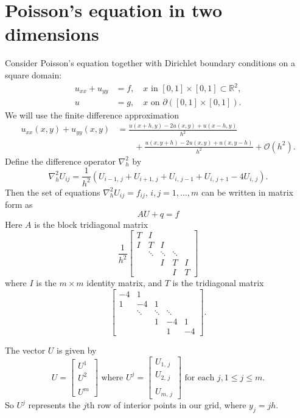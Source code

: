 \section{Poisson's equation in two dimensions}

Consider Poisson's equation together with Dirichlet boundary conditions on a square domain:
\begin{align*}
	u_{xx} + u_{yy} &= f,\quad x \text{ in } [0,1]\times[0,1] \subset \mathbb{R}^2,\\
	u &= g, \quad x \text{ on } \partial \left( [0,1]\times[0,1]\right).
\end{align*}
We will use the finite difference approximation
\begin{align*}
u_{xx}(x,y) + u_{yy}(x,y) &= \frac{u(x+h,y) - 2u(x,y)+ u(x-h,y)}{h^2} \\
& \qquad{}+ 
\frac{u(x,y+h) - 2u(x,y)+ u(x,y-h)}{h^2} + \mathcal{O}(h^2).
\end{align*}
Define the difference operator $\nabla^2_h$ by 
\[
\nabla^2_h U_{ij} = \frac{1}{h^2}(U_{i-1,\,j} + U_{i+1,\,j} + U_{i,\,j-1} + U_{i,\,j+1}-4U_{i,\,j}).
\]
Then the set of equations  $\nabla^2_h U_{ij} = f_{ij}$, $i,j = 1,\ldots,m$ can be written in matrix form as
$$AU + q  = f$$
Here $A$ is the block tridiagonal matrix 
\[
\frac{1}{h^2} \begin{bmatrix}T & I & &  &\\ I &T & I & &\\  &\ddots  & \ddots & \ddots & \\  &  & I & T & I \\
 &  &  & I & T
\end{bmatrix}
\]
where $I$ is the $m\times m$ identity matrix, and $T$ is the tridiagonal matrix
\[
 \begin{bmatrix}-4 & 1 & &  &\\ 1 &-4 & 1 & &\\  &\ddots  & \ddots & \ddots & \\  &  & 1 & -4 & 1 \\
 &  &  & 1 & -4
\end{bmatrix}.
\]

The vector $U$ is given by 
\[
U = \begin{bmatrix} U^1 \\ U^2 \\ \\ U^m \end{bmatrix} \text{ where } U^j = 
\begin{bmatrix} U_{1,\,j} \\ U_{2,\,j} \\ \\ U_{m,\,j} \end{bmatrix} \text{ for each } j, 1\leq j \leq m.
\]
So $U^j$ represents the $j$th row of interior points in our grid, where $y_j = jh.$


